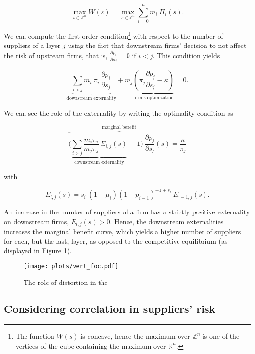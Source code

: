 \documentclass[american, abstract=on]{scrartcl}
\renewcommand{\Re}{\mathbb{R}}
\begin{document}
\begin{equation}
  \max_{s \in \mathbb{Z}^n} W(s) = \max_{s \in \mathbb{Z}^n} \sum^n_{i = 0} m_i \ \Pi_i(s).
\end{equation}

We can compute the first order condition\footnote{The function $W(s)$ is concave, hence the maximum over $\mathbb{Z}^n$ is one of the vertices of the cube containing the maximum over $\Re^n$.} with respect to the number of suppliers of a layer $j$ using the fact that downstream firms' decision to not affect the risk of upstream firms, that is, $\frac{\partial p_i}{\partial s_j} = 0$ if $i < j$. This condition yields

\begin{equation}
  \underbrace{\sum_{i > j} m_i \ \pi_i \ \frac{\partial p_i}{\partial s_j}}_{\text{downstream externality}} + m_j  \underbrace{\left( \pi_j \frac{\partial p_j}{\partial s_j} - \kappa\right)}_{\text{firm's optimization}} = 0.
\end{equation}

We can see the role of the externality by writing the optimality condition as 

\begin{equation} \label{eq:distortion}
  \overbrace{\Bigg(\underbrace{\sum_{i> j} \frac{m_i\pi_i}{m_j\pi_j} \ E_{i, j}(s)}_{\text{downstream externality}} + \ 1 \Bigg)\ \frac{\partial p_j}{\partial s_j}(s)}^{\text{marginal benefit}} = \frac{\kappa}{\pi_j}
\end{equation}

with

\begin{equation}
  E_{i, j}(s) = s_i \ (1 - \mu_i) (1 - p_{i-1})^{-1 + s_i}\ E_{i - 1, j}(s).
\end{equation}

An increase in the number of suppliers of a firm has a strictly positive externality on downstream firms, $E_{i, j}(s) > 0$. Hence, the downstream externalities increases the marginal benefit curve, which yields a higher number of suppliers for each, but the last, layer, as opposed to the competitive equilibrium (as displayed in Figure \ref{fig:vert_foc}).


\begin{figure}[H]
  \centering
  \texttt{[image: plots/vert\_foc.pdf]} 
  \caption{The role of distortion in the }
  \label{fig:vert_foc}
\end{figure}

\subsection{Considering correlation in suppliers' risk} \label{sec:vertical:considering}
\end{document}
